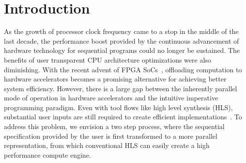 \documentclass{sig-alternate}
\begin{document}



\section{Introduction}
As the growth of processor clock frequency came to a stop in the middle of the last decade, the performance boost provided by the continuous advancement of hardware technology for sequential programs could no longer be sustained. The benefits of user transparent CPU architecture optimizations were also diminishing. With the recent advent of FPGA SoCs~\cite{chips:zynq}, offloading computation to hardware accelerators becomes a promising alternative for
achieving better system efficiency. However,
there is a large gap between the inherently parallel mode of operation in hardware accelerators and the intuitive imperative programming paradigm. Even with tool flows like
high level synthesis (HLS), substantial user inputs are still required to create
efficient implementations~\cite{7082747}. To address this problem, we envision a two
step process, where the sequential specification provided by the user is first
transformed to a more parallel representation, from which conventional HLS
can easily create a high performance compute engine.

\end{document}
